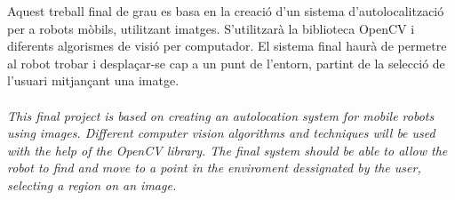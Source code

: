 	Aquest treball final de grau es basa en la creació d'un sistema d'autolocalització per a robots mòbils, utilitzant imatges. S'utilitzarà la biblioteca OpenCV i diferents algorismes de visió per computador.
	El sistema final haurà de permetre al robot trobar i desplaçar-se cap a un punt de l'entorn, partint de la selecció de l'usuari mitjançant una imatge.\\\\
	\textit{This final project is based on creating an autolocation system for mobile robots using images. Different computer vision algorithms and techniques will be used with the help of
	the OpenCV library. The final system should be able to allow the robot to find and move to a point in the enviroment dessignated by the user, selecting a region on an image.}

